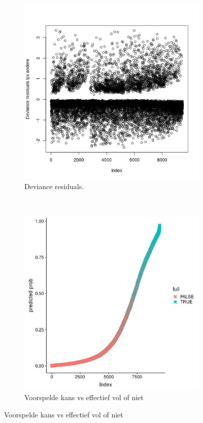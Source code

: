 \documentclass[a4paper,kulak]{kulakarticle} %
\begin{document}
\begin{figure}[H]
	\centering
	\begin{subfigure}[b]{0.37\textwidth}
		\includegraphics[width=\textwidth]{devres.jpg}
		\caption{Deviance residuals.}
		\label{fig:rpn}
	\end{subfigure}
	~
	\begin{subfigure}[b]{0.3\textwidth}
		\includegraphics[width=\textwidth]{kunst.jpg}
		\caption{Voorspelde kans vs effectief vol of niet}
		\label{fig:kunst}
	\end{subfigure}
\end{figure}
\end{document}
